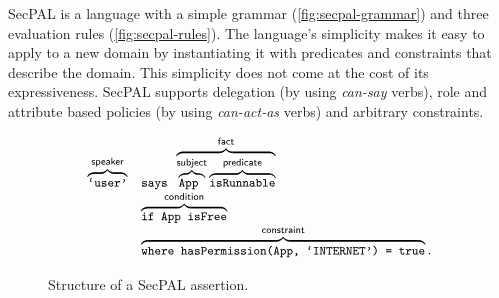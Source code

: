 \documentclass[thesis.tex]{subfiles}
\begin{document}
SecPAL is a language with a simple grammar
(\autoref{fig:secpal-grammar}) and three evaluation rules
(\autoref{fig:secpal-rules}). The language's simplicity makes it easy
to apply to a new domain by instantiating it with predicates and
constraints that describe the domain. This simplicity does not come at
the cost of its expressiveness. SecPAL supports delegation (by using
\emph{can-say} verbs), role and attribute based policies (by using
\emph{can-act-as} verbs) and arbitrary constraints.

\begin{figure}
  \newcommand{\bracetext}[1]{\text{\sffamily #1}}
  \newcommand{\smalltext}[1]{\text{\ttfamily\small #1}}
  \centering
  \begin{equation*}
    \begin{array}{r l}
      \overbrace{\smalltext{`user'}}^{\bracetext{speaker}} &
                                                             \smalltext{ says }\overbrace{\overbrace{\smalltext{ App }}^{\bracetext{subject}}\overbrace{\smalltext{ isRunnable}}^{\bracetext{predicate}}}^{\bracetext{fact}} \\
                                                           & \overbrace{\smalltext{ if App isFree}}^{\bracetext{condition}} \\
                                                           & \overbrace{\smalltext{ where hasPermission(App, `INTERNET') = true}}^{\bracetext{constraint}}.
    \end{array}
  \end{equation*}
  \caption{Structure of a SecPAL assertion.}
  \label{fig:assertion}
\end{figure}
\end{document}
